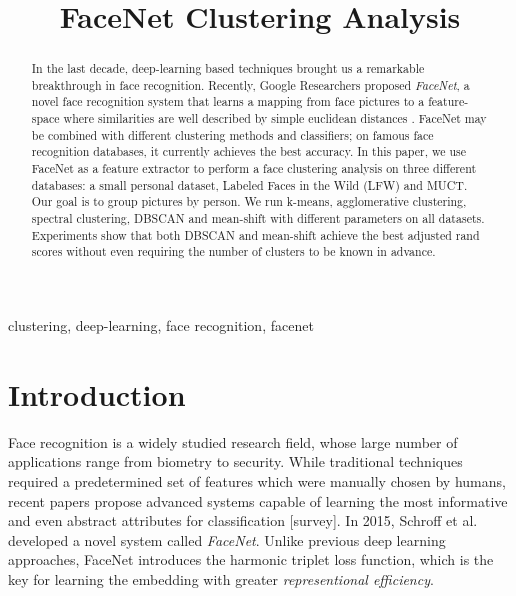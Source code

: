 \documentclass[conference]{IEEEtran}
\begin{document}
\title{FaceNet Clustering Analysis}

\author{
}


\maketitle

\begin{abstract}
In the last decade, deep-learning based techniques brought us a remarkable breakthrough in face recognition.
Recently, Google Researchers proposed \textit{FaceNet}, a novel face recognition system that learns a mapping from face pictures to a feature-space where similarities are well described by simple euclidean distances \cite{??}.
FaceNet may be combined with different clustering methods and classifiers; on famous face recognition databases, it currently achieves the best accuracy.
In this paper, we use FaceNet as a feature extractor to perform a face clustering analysis on three different databases: a small personal dataset, Labeled Faces in the Wild (LFW) and MUCT.
Our goal is to group pictures by person.
We run k-means, agglomerative clustering, spectral clustering, DBSCAN and mean-shift with different parameters on all datasets.
Experiments show that both DBSCAN and mean-shift achieve the best adjusted rand scores without even requiring the number of clusters to be known in advance.

\end{abstract}

\begin{IEEEkeywords}
clustering, deep-learning, face recognition, facenet
\end{IEEEkeywords}

\section{Introduction}

Face recognition is a widely studied research field, whose large number of applications range from biometry to security.
While traditional techniques required a predetermined set of features which were manually chosen by humans, recent papers propose advanced systems capable of learning the most informative and even abstract attributes for classification \cite{??}[survey].
In 2015, Schroff et al. \cite{??} developed a novel system called \textit{FaceNet}.
Unlike previous deep learning approaches, FaceNet introduces the harmonic triplet loss function, which is the key for learning the embedding with greater \textit{representional efficiency}.
\end{document}
